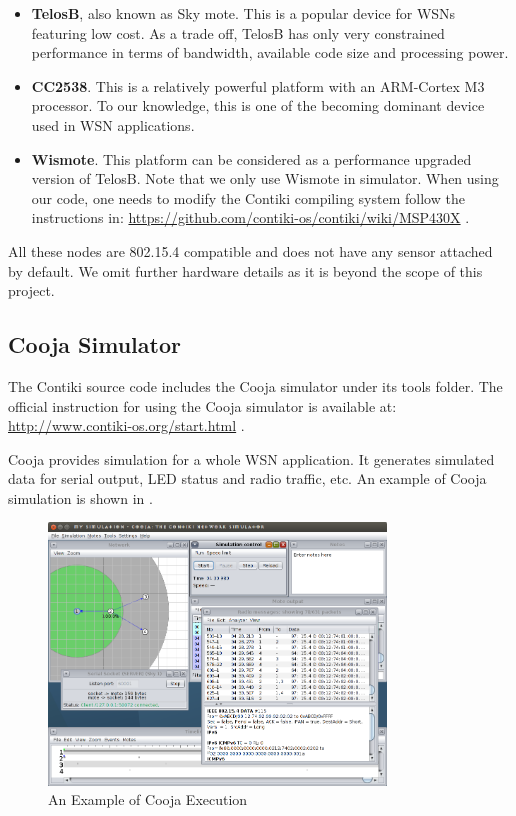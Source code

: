 \begin{itemize}
	\item \textbf{TelosB}\cite{TelosB}, also known as Sky mote. This is a popular device for WSNs featuring low cost. As a trade off, TelosB has only very constrained performance in terms of bandwidth, available code size and processing power.
	
	\item \textbf{CC2538}\cite{CC2538}. This is a relatively powerful platform with an ARM-Cortex M3 processor. To our knowledge, this is one of the becoming dominant device used in WSN applications.
	
	\item \textbf{Wismote}\cite{Wismote}. This platform can be considered as a performance upgraded version of TelosB. Note that we only use Wismote in simulator. When using our code, one needs to modify the Contiki compiling system follow the instructions in: \url{https://github.com/contiki-os/contiki/wiki/MSP430X} .
\end{itemize}

All these nodes are 802.15.4\cite{802154} compatible and does not have any sensor attached by default. We omit further hardware details as it is beyond the scope of this project. 

\subsection{Cooja Simulator}

The Contiki source code includes the Cooja simulator under its tools folder. The official instruction for using the Cooja simulator is available at: \url{http://www.contiki-os.org/start.html} .

Cooja provides simulation for a whole WSN application. It generates simulated data for serial output, LED status and radio traffic, etc. An example of Cooja simulation is shown in .

\begin{figure}[h!]
	\center
	\includegraphics[width=0.8\textwidth]{fig/cooja_example.png}
	\caption{An Example of Cooja Execution}
	\label{Fig: An Example of Cooja Execution}
\end{figure}

